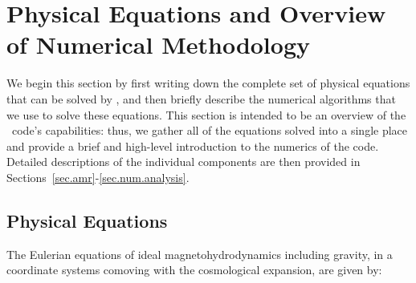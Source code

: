

\section{Physical Equations and Overview of Numerical Methodology}
\label{sec.overview}

We begin this section by first writing down the complete set of
physical equations that can be solved by \enzo, and then briefly describe
the numerical algorithms that we use to solve these equations.  This
section is intended to be an overview of the \enzo\ code's
capabilities: thus, we gather all of the equations solved into a
single place and provide a brief and high-level introduction to the
numerics of the code.  Detailed descriptions of the individual
components are then provided in Sections~\ref{sec.amr}-\ref{sec.num.analysis}.


\subsection{Physical Equations}
\label{sec.equations}



The Eulerian equations of ideal magnetohydrodynamics including gravity,
in a coordinate systems comoving with the cosmological expansion, are
given by:

